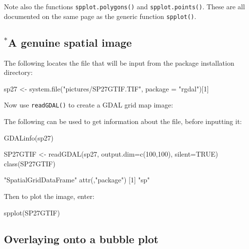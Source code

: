 \documentclass{tufte-book}\usepackage[]{graphicx}\usepackage[]{color}
\newcommand{\txtt}[1]{\texttt{#1}}
\begin{document}
  Note also the functions \txtt{spplot.polygons()} and
  \txtt{spplot.points()}.  These are all documented on the same page
  as the generic function \txtt{spplot()}.

\subsection*{$^*$A genuine spatial image}

The following locates the file that will be input
from the package installation directory:
\begin{Schunk}
\begin{Sinput}
sp27 <- system.file("pictures/SP27GTIF.TIF",
                    package = "rgdal")[1]
\end{Sinput}
\end{Schunk}

Now use \txtt{readGDAL()} to create a GDAL grid map image:
\begin{marginfigure}
The following can be used to get information about the file,
before inputting it:
\begin{Schunk}
\begin{Sinput}
GDALinfo(sp27)
\end{Sinput}
\end{Schunk}
\end{marginfigure}
\begin{Schunk}
\begin{Sinput}
SP27GTIF <- readGDAL(sp27, output.dim=c(100,100),
                     silent=TRUE)
class(SP27GTIF)
\end{Sinput}
\begin{Soutput}
[1] "SpatialGridDataFrame"
attr(,"package")
[1] "sp"
\end{Soutput}
\end{Schunk}
Then to plot the image, enter:
\begin{Schunk}
\begin{Sinput}
spplot(SP27GTIF)
\end{Sinput}
\end{Schunk}

\subsection{Overlaying onto a bubble plot}
\end{document}
